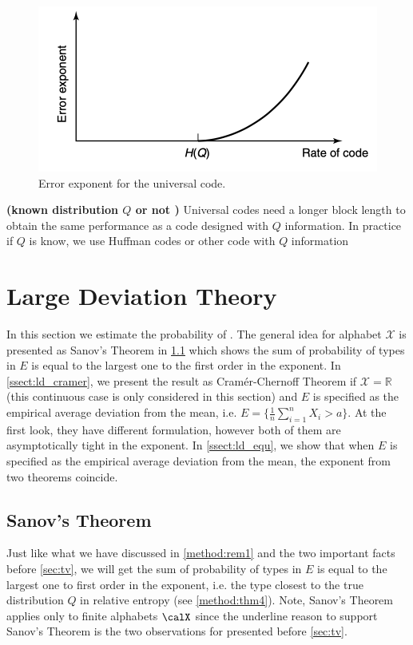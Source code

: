 \documentclass{article}
\newcommand{\bfs}[1]{\textbf{({#1})}}
\begin{document}
\begin{figure}[ht]
 \centering
 \includegraphics[width=0.5\linewidth]{Figs/fig2.png}
\centering
\caption{Error exponent for the universal code.}
		\label{un:fig2}
\end{figure}

\begin{rema}{\bfs{known distribution $Q$ or not }}
Universal codes need a longer block length to obtain the same performance as a code designed with $Q$ information. In practice if $Q$ is know, we  use Huffman codes or other code with $Q$ information
\end{rema}

\section{Large Deviation Theory}
In this section we estimate the probability of . The general idea for  alphabet $\mathcal{X}$ is presented as Sanov's Theorem in \cref{ssect:ld_snao} which shows the sum of probability of types in $E$ is equal to the largest one to the first order in the exponent. In \cref{ssect:ld_cramer}, we present the result as Cram\'{e}r-Chernoff Theorem if $\mathcal{X}=\mathbb{R}$ (this continuous case is only considered in this section) and $E$ is specified as the empirical average deviation from the mean, i.e. $E=\{\frac{1}{n}\sum_{i=1}^n X_i>a\}$. At the first look, they have different formulation, however both of them are asymptotically tight in the exponent. In \cref{ssect:ld_equ}, we show that when $E$ is specified as the empirical average deviation from the mean, the exponent from two theorems coincide. 
\subsection{Sanov's Theorem}\label{ssect:ld_snao}

Just like what we have discussed in \cref{method:rem1} and the two important facts before \cref{sec:tv}, we will get  the sum of probability of types in $E$ is equal to the largest one to first order in the exponent, i.e. the type closest to the true distribution $Q$ in relative entropy (see \cref{method:thm4}). Note, Sanov's Theorem applies only to finite alphabets $\calX$ since the underline reason to support 
Sanov's Theorem is the two observations for  presented before \cref{sec:tv}.
\end{document}

